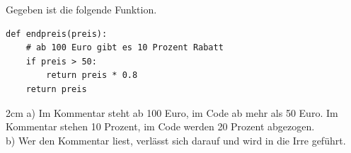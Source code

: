 \question[3]
Gegeben ist die folgende Funktion.
\begin{lstlisting}
def endpreis(preis):
    # ab 100 Euro gibt es 10 Prozent Rabatt
    if preis > 50:
        return preis * 0.8
    return preis
\end{lstlisting}
\begin{solutionbox}{2cm}
a) Im Kommentar steht ab 100 Euro, im Code ab mehr als 50 Euro. Im Kommentar stehen 10 Prozent, im Code werden 20 Prozent abgezogen. \\
b) Wer den Kommentar liest, verlässt sich darauf und wird in die Irre geführt.
\end{solutionbox}
